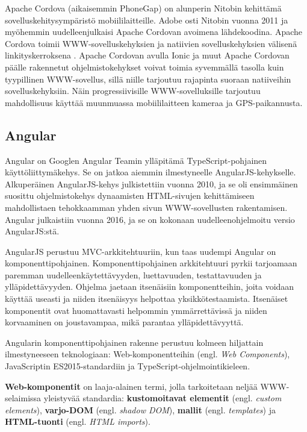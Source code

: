 \documentclass[utf8]{gradu3}
\begin{document}
Apache Cordova (aikaisemmin PhoneGap) on alunperin Nitobin kehittämä sovelluskehitysympäristö mobiililaitteille. Adobe osti Nitobin vuonna 2011 ja myöhemmin uudelleenjulkaisi Apache Cordovan avoimena lähdekoodina. Apache Cordova toimii WWW-sovelluskehyksien ja natiivien sovelluskehyksien välisenä linkityskerroksena \parencite[]{ionic-framework-hybrid}. Apache Cordovan avulla Ionic ja muut Apache Cordovan päälle rakennetut ohjelmistokehykset voivat toimia syvemmällä tasolla kuin tyypillinen WWW-sovellus, sillä niille tarjoutuu rajapinta suoraan natiiveihin sovelluskehyksiin. Näin progressiivisille WWW-sovelluksille tarjoutuu mahdollisuus käyttää muunmuassa mobiililaitteen kameraa ja GPS-paikannusta.

\subsection{Angular}

Angular on Googlen Angular Teamin ylläpitämä TypeScript-pohjainen käyttöliittymäkehys. Se on jatkoa aiemmin ilmestyneelle AngularJS-kehykselle. Alkuperäinen AngularJS-kehys julkistettiin vuonna 2010, ja se oli ensimmäinen suosittu ohjelmistokehys dynaamisten HTML-sivujen kehittämiseen mahdollistaen tehokkaamman yhden sivun WWW-sovellusten rakentamisen. Angular julkaistiin vuonna 2016, ja se on kokonaan uudelleenohjelmoitu versio AngularJS:stä.

AngularJS perustuu MVC-arkkitehtuuriin, kun taas uudempi Angular on komponenttipohjainen. Komponenttipohjainen arkkitehtuuri pyrkii tarjoamaan paremman uudelleenkäytettävyyden, luettavuuden, testattavuuden ja ylläpidettävyyden. Ohjelma jaetaan itsenäisiin komponentteihin, joita voidaan käyttää useasti ja niiden itsenäisyys helpottaa yksikkötestaamista. Itsenäiset komponentit ovat huomattavasti helpommin ymmärrettävissä ja niiden korvaaminen on joustavampaa, mikä parantaa ylläpidettävyyttä. \parencite[]{good-and-bad-angular} 

Angularin komponenttipohjainen rakenne perustuu kolmeen hiljattain ilmestyneeseen teknologiaan: Web-komponentteihin (engl. \textit{Web Components}), JavaScriptin ES2015-standardiin ja TypeScript-ohjelmointikieleen.

\textbf{Web-komponentit} on laaja-alainen termi, jolla tarkoitetaan neljää WWW-selaimissa yleistyvää standardia: \textbf{kustomoitavat elementit} (engl. \textit{custom elements}), \textbf{varjo-DOM} (engl. \textit{shadow DOM}), \textbf{mallit} (engl. \textit{templates}) ja \textbf{HTML-tuonti} (engl. \textit{HTML imports}). 
\end{document}
